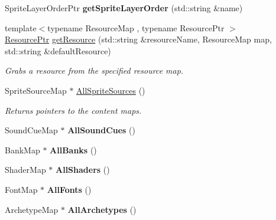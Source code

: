\begin{DoxyCompactItemize}
\item 
\hypertarget{classDCEngine_1_1Systems_1_1Content_a43f242646a99a40b9749293795601477}{Sprite\-Layer\-Order\-Ptr {\bfseries get\-Sprite\-Layer\-Order} (std\-::string \&name)}\label{classDCEngine_1_1Systems_1_1Content_a43f242646a99a40b9749293795601477}

\item 
{\footnotesize template$<$typename Resource\-Map , typename Resource\-Ptr $>$ }\\\hyperlink{classDCEngine_1_1Resource}{Resource\-Ptr} \hyperlink{classDCEngine_1_1Systems_1_1Content_a92df7e4fd77e9e4fc4204d9c880c8248}{get\-Resource} (std\-::string \&resource\-Name, Resource\-Map map, std\-::string \&default\-Resource)
\begin{DoxyCompactList}\small\item\em Grabs a resource from the specified resource map. \end{DoxyCompactList}\item 
Sprite\-Source\-Map $\ast$ \hyperlink{classDCEngine_1_1Systems_1_1Content_a50cfd9d9a15fcf6fe711eb59d63e03c4}{All\-Sprite\-Sources} ()
\begin{DoxyCompactList}\small\item\em Returns pointers to the content maps. \end{DoxyCompactList}\item 
\hypertarget{classDCEngine_1_1Systems_1_1Content_a7f876b92447ff49b6d7907f0c2e362b4}{Sound\-Cue\-Map $\ast$ {\bfseries All\-Sound\-Cues} ()}\label{classDCEngine_1_1Systems_1_1Content_a7f876b92447ff49b6d7907f0c2e362b4}

\item 
\hypertarget{classDCEngine_1_1Systems_1_1Content_aa215e996bfe9a49e46f686fffd56f6b4}{Bank\-Map $\ast$ {\bfseries All\-Banks} ()}\label{classDCEngine_1_1Systems_1_1Content_aa215e996bfe9a49e46f686fffd56f6b4}

\item 
\hypertarget{classDCEngine_1_1Systems_1_1Content_ad8e840c065a39aa71031aa4161509f17}{Shader\-Map $\ast$ {\bfseries All\-Shaders} ()}\label{classDCEngine_1_1Systems_1_1Content_ad8e840c065a39aa71031aa4161509f17}

\item 
\hypertarget{classDCEngine_1_1Systems_1_1Content_a7d7b84805bb80abf84887787bea767b1}{Font\-Map $\ast$ {\bfseries All\-Fonts} ()}\label{classDCEngine_1_1Systems_1_1Content_a7d7b84805bb80abf84887787bea767b1}

\item 
\hypertarget{classDCEngine_1_1Systems_1_1Content_a7c131ce00ce9432a3c15c3443f4353ad}{Archetype\-Map $\ast$ {\bfseries All\-Archetypes} ()}\label{classDCEngine_1_1Systems_1_1Content_a7c131ce00ce9432a3c15c3443f4353ad}


\end{DoxyCompactItemize}

